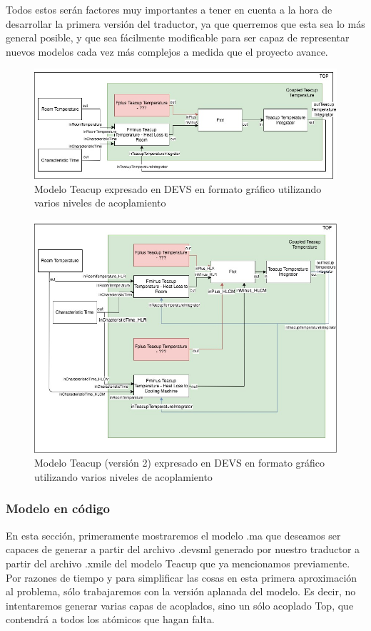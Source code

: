 Todos estos serán factores muy importantes a tener en cuenta a la hora de desarrollar la primera versión del traductor, ya que querremos que esta sea lo más general posible, y que sea fácilmente modificable para ser capaz de representar nuevos modelos cada vez más complejos a medida que el proyecto avance.

\begin{figure}[!h]
\centering
\includegraphics[scale=0.35]{imagenes/Teacup_devs}
\caption{Modelo Teacup expresado en DEVS en formato gráfico utilizando varios niveles de acoplamiento}
\label{fig:Teacup_devs}
\end{figure}
\begin{figure}[!h]
\centering
\includegraphics[scale=0.35]{imagenes/Teacup_devs_2}
\caption{Modelo Teacup (versión 2) expresado en DEVS en formato gráfico utilizando varios niveles de acoplamiento}
\label{fig:Teacup_devs_2}
\end{figure}

\subsubsection{Modelo en código}
En esta sección, primeramente mostraremos el modelo .ma que deseamos ser capaces de generar a partir del archivo .devsml generado por nuestro traductor a partir del archivo .xmile del modelo Teacup que ya mencionamos previamente. Por razones de tiempo y para simplificar las cosas en esta primera aproximación al problema, sólo trabajaremos con la versión aplanada del modelo. Es decir, no intentaremos generar varias capas de acoplados, sino un sólo acoplado Top, que contendrá a todos los atómicos que hagan falta.

